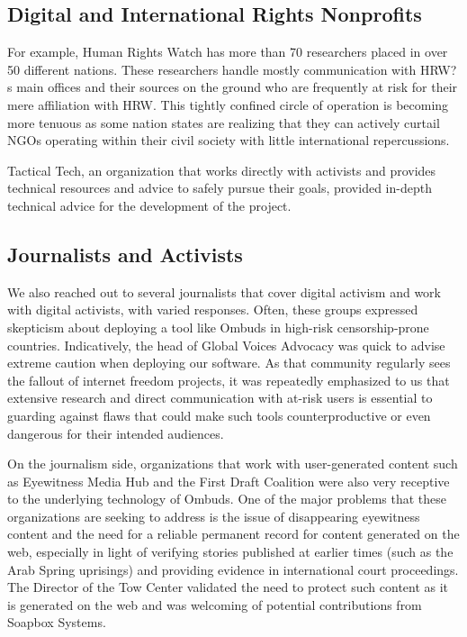 \documentclass[a4paper]{article}
\begin{document}
\subsection{Digital and International Rights Nonprofits}
For example, Human Rights Watch has more than 70 researchers placed in over 50 different nations. These researchers handle mostly communication with HRW?s main offices and their sources on the ground who are frequently at risk for their mere affiliation with HRW. This tightly confined circle of operation is becoming more tenuous as some nation states are realizing that they can actively curtail NGOs operating within their civil society with little international repercussions.\par

Tactical Tech, an organization that works directly with activists and provides technical resources and advice to safely pursue their goals, provided in-depth technical advice for the development of the project.\par

\subsection{Journalists and Activists}
We also reached out to several journalists that cover digital activism and work with digital activists, with varied responses. Often, these groups expressed skepticism about deploying a tool like Ombuds in high-risk censorship-prone countries. Indicatively, the head of Global Voices Advocacy was quick to advise extreme caution when deploying our software. As that community regularly sees the fallout of internet freedom projects, it was repeatedly emphasized to us that extensive research and direct communication with at-risk users is essential to guarding against flaws that could make such tools counterproductive or even dangerous for their intended audiences. \par

On the journalism side, organizations that work with user-generated content such as Eyewitness Media Hub and the First Draft Coalition were also very receptive to the underlying technology of Ombuds. One of the major problems that these organizations are seeking to address is the issue of disappearing eyewitness content and the need for a reliable permanent record for content generated on the web, especially in light of verifying stories published at earlier times (such as the Arab Spring uprisings) and providing evidence in international court proceedings. The Director of the Tow Center validated the need to protect such content as it is generated on the web and was welcoming of potential contributions from Soapbox Systems.\par
\end{document}
